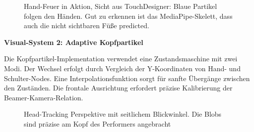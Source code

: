 \begin{figure}[htbp]
    \centering
    \caption{Hand-Feuer in Aktion, Sicht aus TouchDesigner: Blaue Partikel folgen den Händen. Gut zu erkennen ist das MediaPipe-Skelett, dass auch die nicht sichtbaren Füße predicted.}
    \label{fig:hand_fire_action}
\end{figure}

\textbf{Visual-System 2: Adaptive Kopfpartikel}

Die Kopfpartikel-Implementation verwendet eine Zustandsmaschine mit zwei Modi. Der Wechsel erfolgt durch Vergleich der Y-Koordinaten von Hand- und Schulter-Nodes. Eine Interpolationsfunktion sorgt für sanfte Übergänge zwischen den Zuständen. Die frontale Ausrichtung erfordert präzise Kalibrierung der Beamer-Kamera-Relation.

\begin{figure}[htbp]
    \centering
    \caption{Head-Tracking Perspektive mit seitlichem Blickwinkel. Die Blobs sind präzise am Kopf des Performers angebracht}
    \label{fig:low_light_tracking}
\end{figure}

